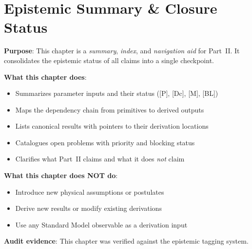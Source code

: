 
\chapter{Epistemic Summary \& Closure Status}
\label{ch:ch20_epistemic_summary}


\begin{tcolorbox}[colback=yellow!5!white, colframe=yellow!70!black,
    title=\textbf{Scope Guard: What This Chapter Is (and Is Not)}]

\textbf{Purpose}: This chapter is a \emph{summary}, \emph{index}, and \emph{navigation aid}
for Part~II. It consolidates the epistemic status of all claims into a single checkpoint.

\textbf{What this chapter does}:
\begin{itemize}[nosep]
    \item Summarizes parameter inputs and their status ([P], [Dc], [M], [BL])
    \item Maps the dependency chain from primitives to derived outputs
    \item Lists canonical results with pointers to their derivation locations
    \item Catalogues open problems with priority and blocking status
    \item Clarifies what Part~II claims and what it does \emph{not} claim
\end{itemize}

\textbf{What this chapter does NOT do}:
\begin{itemize}[nosep]
    \item Introduce new physical assumptions or postulates
    \item Derive new results or modify existing derivations
    \item Use any Standard Model observable as a derivation input
\end{itemize}

\textbf{Audit evidence}: This chapter was verified against the epistemic tagging system.
\end{tcolorbox}

